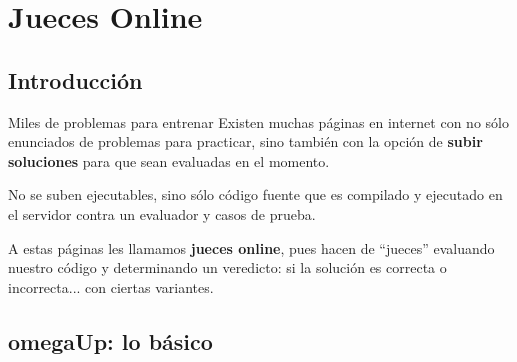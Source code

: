\documentclass{beamer}
\begin{document}
    \section{Jueces Online}
    \begin{frame}
        \tableofcontents[currentsection]
    \end{frame}

    \subsection{Introducción}
    \begin{frame}
    \end{frame}

    \begin{frame}{Miles de problemas para entrenar}
        Existen muchas páginas en internet con no sólo enunciados de problemas para practicar, sino también con la opción de \textbf{subir soluciones} para que sean evaluadas en el momento. \pause 

        No se suben ejecutables, sino sólo código fuente que es compilado y ejecutado en el servidor contra un evaluador y casos de prueba. \pause 

        A estas páginas les llamamos \textbf{jueces online}, pues hacen de ``jueces'' evaluando nuestro código y determinando un veredicto: si la solución es correcta o incorrecta... \pause con ciertas variantes.
    \end{frame}

    \subsection{omegaUp: lo básico}
    \begin{frame}
    \end{frame}
\end{document}
